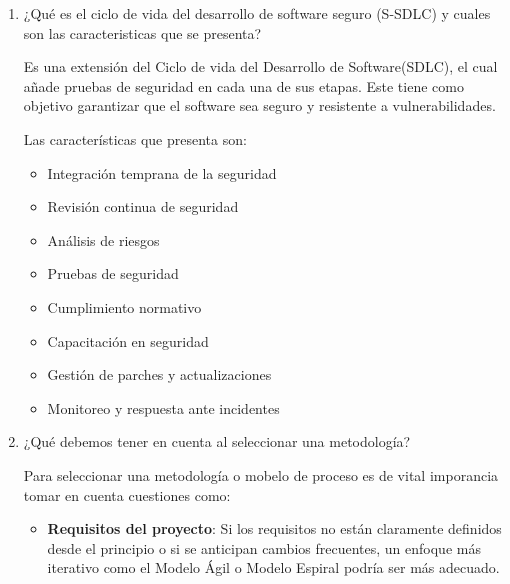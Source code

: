     \begin{enumerate}
        \item ¿Qué es el ciclo de vida del desarrollo de software seguro (S-SDLC) y cuales
            son las caracteristicas que se presenta?

            Es una extensión del Ciclo de vida del Desarrollo de Software(SDLC), el cual añade
            pruebas de seguridad en cada una de sus etapas. Este tiene como objetivo
            garantizar que el software sea seguro y resistente a vulnerabilidades.

            Las características que presenta son:

            \begin{itemize}
                \item Integración temprana de la seguridad

                \item Revisión continua de seguridad

                \item Análisis de riesgos

                \item Pruebas de seguridad

                \item Cumplimiento normativo

                \item Capacitación en seguridad

                \item Gestión de parches y actualizaciones

                \item Monitoreo y respuesta ante incidentes
            \end{itemize}

        \item ¿Qué debemos tener en cuenta al seleccionar una metodología?

            Para seleccionar una metodología o mobelo de proceso es de vital imporancia tomar
            en cuenta cuestiones como:

            \begin{itemize}
                \item \textbf{Requisitos del proyecto}: Si los requisitos no están claramente
                    definidos desde el principio o si se anticipan cambios frecuentes, un
                    enfoque más iterativo como el Modelo Ágil o Modelo Espiral podría ser
                    más adecuado.


\end{itemize}
\end{enumerate}
